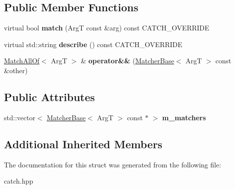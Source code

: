 \subsection*{Public Member Functions}
\begin{DoxyCompactItemize}
\item 
\mbox{\label{structCatch_1_1Matchers_1_1Impl_1_1MatchAllOf_a7bf0c2d8cedf67ecf9d0a527cb5a8263}} 
virtual bool {\bfseries match} (ArgT const \&arg) const C\+A\+T\+C\+H\+\_\+\+O\+V\+E\+R\+R\+I\+DE
\item 
\mbox{\label{structCatch_1_1Matchers_1_1Impl_1_1MatchAllOf_aaefeba99a0b35425203468a65bff544b}} 
virtual std\+::string {\bfseries describe} () const C\+A\+T\+C\+H\+\_\+\+O\+V\+E\+R\+R\+I\+DE
\item 
\mbox{\label{structCatch_1_1Matchers_1_1Impl_1_1MatchAllOf_a9d0e38b36474336498d627610db434f3}} 
\hyperlink{structCatch_1_1Matchers_1_1Impl_1_1MatchAllOf}{Match\+All\+Of}$<$ ArgT $>$ \& {\bfseries operator\&\&} (\hyperlink{structCatch_1_1Matchers_1_1Impl_1_1MatcherBase}{Matcher\+Base}$<$ ArgT $>$ const \&other)
\end{DoxyCompactItemize}
\subsection*{Public Attributes}
\begin{DoxyCompactItemize}
\item 
\mbox{\label{structCatch_1_1Matchers_1_1Impl_1_1MatchAllOf_a98d6a2611f195a4a5c49f92fd877be9a}} 
std\+::vector$<$ \hyperlink{structCatch_1_1Matchers_1_1Impl_1_1MatcherBase}{Matcher\+Base}$<$ ArgT $>$ const  $\ast$ $>$ {\bfseries m\+\_\+matchers}
\end{DoxyCompactItemize}
\subsection*{Additional Inherited Members}


The documentation for this struct was generated from the following file\+:\begin{DoxyCompactItemize}
\item 
catch.\+hpp\end{DoxyCompactItemize}
